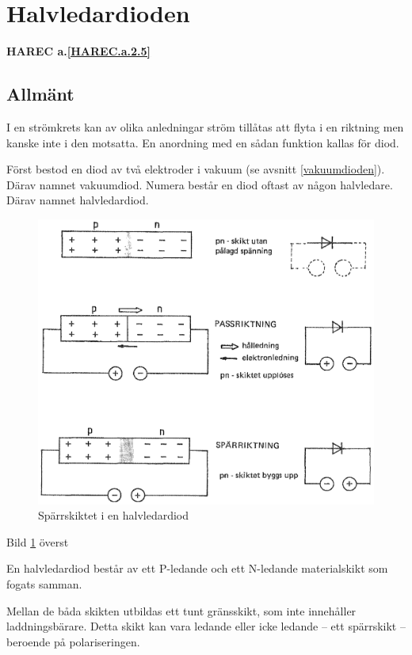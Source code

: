 \section{Halvledardioden}
\textbf{HAREC a.\ref{HAREC.a.2.5}\label{myHAREC.a.2.5}}

\subsection{Allmänt}
I en strömkrets kan av olika anledningar ström tillåtas att flyta i en riktning
men kanske inte i den motsatta. En anordning med en sådan funktion kallas för
diod.

Först bestod en diod av två elektroder i vakuum (se avsnitt
\ref{vakuumdioden}). Därav namnet vakuumdiod.
Numera består en diod oftast av någon halvledare. Därav namnet halvledardiod.

\begin{figure}
\includegraphics[width=\textwidth]{images/cropped_pdfs/bild_2_2-12.pdf}
\caption{Spärrskiktet i en halvledardiod}
\label{fig:BildII2-12}
\end{figure}

Bild \ref{fig:BildII2-12} överst

En halvledardiod består av ett P-ledande och ett N-ledande materialskikt som
fogats samman.

Mellan de båda skikten utbildas ett tunt gränsskikt, som inte innehåller
laddningsbärare. Detta skikt kan vara ledande eller icke ledande -- ett
spärrskikt -- beroende på polariseringen.

